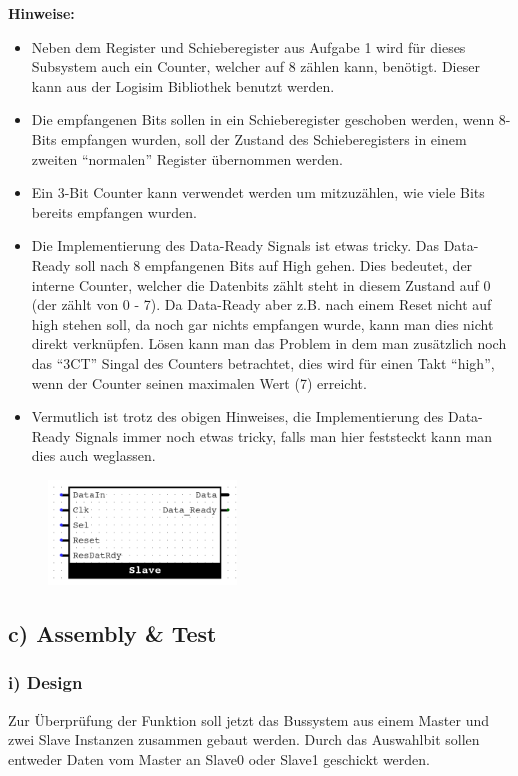 \documentclass[a4paper]{scrartcl}
\begin{document}
\textbf{Hinweise:}
\begin{itemize}
 \item Neben dem Register und Schieberegister aus Aufgabe 1 wird für dieses Subsystem auch ein Counter, welcher auf 8 zählen kann, benötigt. Dieser kann aus
  der Logisim Bibliothek benutzt werden.
  \item Die empfangenen Bits sollen in ein Schieberegister geschoben werden, wenn 8-Bits empfangen wurden, soll der Zustand
  des Schieberegisters in einem zweiten ``normalen'' Register übernommen
  werden.
  \item Ein 3-Bit Counter kann verwendet werden um mitzuzählen, wie viele Bits bereits empfangen wurden.
  \item Die Implementierung des Data-Ready Signals ist etwas tricky. Das Data-Ready soll nach 8 empfangenen Bits auf High gehen.  
  Dies bedeutet, der interne Counter, welcher die Datenbits zählt steht in diesem Zustand auf 0 (der zählt von 0 - 7).
  Da Data-Ready aber z.B. nach einem Reset nicht auf high stehen soll, da noch gar nichts empfangen wurde, kann man dies nicht direkt verknüpfen.
  Lösen kann man das Problem in dem man zusätzlich noch das ``3CT'' 
  Singal des Counters betrachtet, dies wird für einen Takt ``high'', wenn der Counter seinen maximalen Wert (7) erreicht.
  \item Vermutlich ist trotz des obigen Hinweises, die Implementierung des Data-Ready Signals immer noch etwas tricky, falls man hier feststeckt kann man 
  dies auch weglassen.
\end{itemize}


\begin{figure}[h]
\centering
  \includegraphics[width=5cm]{Slave.png}
\end{figure}


\subsection*{c) Assembly \& Test}
\subsubsection*{i) Design}
Zur Überprüfung der Funktion soll jetzt das Bussystem aus einem Master und zwei Slave Instanzen 
zusammen gebaut werden. Durch das Auswahlbit sollen entweder Daten vom Master an Slave0 oder Slave1 geschickt werden.
\end{document}
